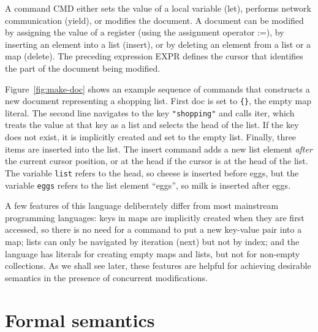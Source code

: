 \documentclass[10pt,journal,compsoc]{IEEEtran}
\begin{document}
A command CMD either sets the value of a local variable (\textsf{let}), performs network communication (\textsf{yield}), or modifies the document. A document can be modified by assigning the value of a register (using the assignment operator :=), by inserting an element into a list (\textsf{insert}), or by deleting an element from a list or a map (\textsf{delete}). The preceding expression EXPR defines the cursor that identifies the part of the document being modified.

Figure~\ref{fig:make-doc} shows an example sequence of commands that constructs a new document representing a shopping list. First \textsf{doc} is set to \verb|{}|, the empty map literal. The second line navigates to the key \verb|"shopping"| and calls \textsf{iter}, which treats the value at that key as a list and selects the head of the list. If the key does not exist, it is implicitly created and set to the empty list. Finally, three items are inserted into the list. The \textsf{insert} command adds a new list element \emph{after} the current cursor position, or at the head if the cursor is at the head of the list. The variable \verb|list| refers to the head, so cheese is inserted before eggs, but the variable \verb|eggs| refers to the list element ``eggs'', so milk is inserted after eggs.

A few features of this language deliberately differ from most mainstream programming languages: keys in maps are implicitly created when they are first accessed, so there is no need for a command to put a new key-value pair into a map; lists can only be navigated by iteration (\textsf{next}) but not by index; and the language has literals for creating empty maps and lists, but not for non-empty collections. As we shall see later, these features are helpful for achieving desirable semantics in the presence of concurrent modifications.

\section{Formal semantics}\label{sec:semantics}
\end{document}
